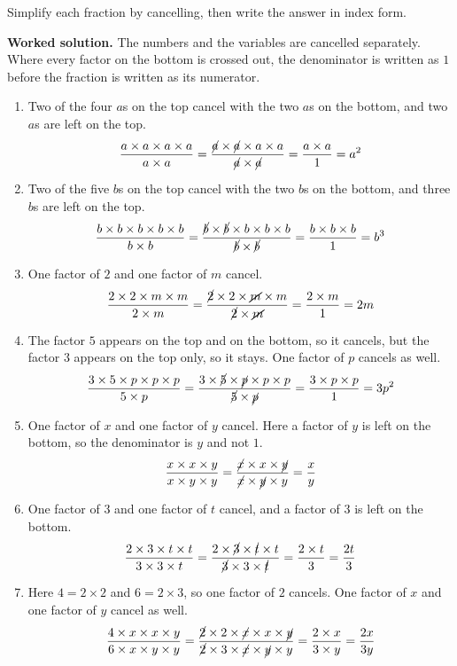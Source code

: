 \documentclass[12pt,a4paper]{article}
\newcommand{\qhead}[2]{\par\addvspace{9pt}%
  \noindent{\bfseries Q#1.}\enspace #2\par\nobreak}
\newcommand{\wsol}{\par\smallskip
  \noindent\textbf{\color{blue!50!black}Worked solution.}\space}
\begin{document}
\newpage

\qhead{6}{Simplify each fraction by cancelling, then write the answer in index
form.}
\wsol
The numbers and the variables are cancelled separately. Where every factor on
the bottom is crossed out, the denominator is written as $1$ before the
fraction is written as its numerator.

\begin{enumerate}
\item Two of the four $a$s on the top cancel with the two $a$s on the bottom,
and two $a$s are left on the top.
\[\frac{a\times a\times a\times a}{a\times a}
  =\frac{\cancel{a}\times\cancel{a}\times a\times a}{\cancel{a}\times\cancel{a}}
  =\frac{a\times a}{1}=a^2\]

\item Two of the five $b$s on the top cancel with the two $b$s on the bottom,
and three $b$s are left on the top.
\[\frac{b\times b\times b\times b\times b}{b\times b}
  =\frac{\cancel{b}\times\cancel{b}\times b\times b\times b}
   {\cancel{b}\times\cancel{b}}=\frac{b\times b\times b}{1}=b^3\]

\item One factor of $2$ and one factor of $m$ cancel.
\[\frac{2\times2\times m\times m}{2\times m}
  =\frac{\cancel{2}\times2\times\cancel{m}\times m}{\cancel{2}\times\cancel{m}}
  =\frac{2\times m}{1}=2m\]

\item The factor $5$ appears on the top and on the bottom, so it cancels, but
the factor $3$ appears on the top only, so it stays. One factor of $p$ cancels
as well.
\[\frac{3\times5\times p\times p\times p}{5\times p}
  =\frac{3\times\cancel{5}\times\cancel{p}\times p\times p}
   {\cancel{5}\times\cancel{p}}=\frac{3\times p\times p}{1}=3p^2\]

\item One factor of $x$ and one factor of $y$ cancel. Here a factor of $y$ is
left on the bottom, so the denominator is $y$ and not $1$.
\[\frac{x\times x\times y}{x\times y\times y}
  =\frac{\cancel{x}\times x\times\cancel{y}}
   {\cancel{x}\times\cancel{y}\times y}=\frac{x}{y}\]

\item One factor of $3$ and one factor of $t$ cancel, and a factor of $3$ is
left on the bottom.
\[\frac{2\times3\times t\times t}{3\times3\times t}
  =\frac{2\times\cancel{3}\times\cancel{t}\times t}
   {\cancel{3}\times3\times\cancel{t}}=\frac{2\times t}{3}=\frac{2t}{3}\]

\item Here $4=2\times2$ and $6=2\times3$, so one factor of $2$ cancels. One
factor of $x$ and one factor of $y$ cancel as well.
\[\frac{4\times x\times x\times y}{6\times x\times y\times y}
  =\frac{\cancel{2}\times2\times\cancel{x}\times x\times\cancel{y}}
   {\cancel{2}\times3\times\cancel{x}\times\cancel{y}\times y}
  =\frac{2\times x}{3\times y}=\frac{2x}{3y}\]


\end{enumerate}
\end{document}

